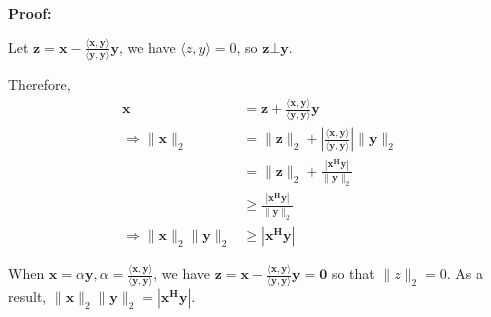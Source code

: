 \documentclass[12pt, letterpaper, onecolumn]{article}
\begin{document}
\begin{enumerate}[start=2]
		\textbf{Proof:}
		
        Let $\bm{z} = \bm{x} - \frac{\langle\bm{x},\bm{y}\rangle}{\langle\bm{y}, \bm{y}\rangle} \bm{y}$, we have $\langle z,y\rangle = 0$, so $\bm{z} \bot  \bm{y}$.

        Therefore, 
        \begin{align*}
            \bm{x} &= \bm{z} + \frac{\langle\bm{x},\bm{y}\rangle}{\langle\bm{y}, \bm{y}\rangle} \bm{y}  \\
            \Longrightarrow 
            \|\bm{x}\|_2 
            &= \|\bm{z}\|_2 + |\frac{\langle\bm{x},\bm{y}\rangle}{\langle\bm{y}, \bm{y}\rangle}| \|\bm{y}\|_2\\
            &= \|\bm{z}\|_2 + \frac{|\bm{x^Hy}|}{\|\bm{y}\|_2}\\
            &\geq \frac{|\bm{x^Hy}|}{\|\bm{y}\|_2} \\
            \Longrightarrow 
            \|\bm{x}\|_2 \|\bm{y}\|_2 &\geq |\bm{x^Hy}|
        \end{align*}

        When $\bm{x} = \alpha \bm{y}, \alpha = \frac{\langle\bm{x},\bm{y}\rangle}{\langle\bm{y}, \bm{y}\rangle}$, we have $\bm{z} = \bm{x} - \frac{\langle\bm{x},\bm{y}\rangle}{\langle\bm{y}, \bm{y}\rangle} \bm{y} = \bm{0}$ so that $\|z\|_2 = 0$. As a result, $\|\bm{x}\|_2 \|\bm{y}\|_2 = |\bm{x^Hy}|$.
	\end{enumerate}
\end{document}
